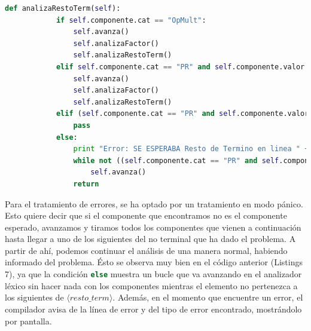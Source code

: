 \documentclass[11pt]{article}
\newcommand{\nt}[1]{\langle#1\rangle}
\begin{document}
\begin{minipage}{\linewidth}
	\begin{lstlisting}[language=Python, caption=analizaRestoTerm()]
		def analizaRestoTerm(self):
			if self.componente.cat == "OpMult":
				self.avanza()
				self.analizaFactor()
				self.analizaRestoTerm()
			elif self.componente.cat == "PR" and self.componente.valor == "Y":
				self.avanza()
				self.analizaFactor()
				self.analizaRestoTerm()
			elif (self.componente.cat == "PR" and self.componente.valor in ["ENTONCES", "HACER", "SINO", "O"]) or self.componente.cat == "ParentCi" or self.componente.cat == "CorCi" or self.componente.cat == "OpRel" or self.componente.cat == "PtoComa" or self.componente.cat == "OpAdd":
				pass
			else: 
				print "Error: SE ESPERABA Resto de Termino en linea " + str(self.lexico.nlinea)
				while not ((self.componente.cat == "PR" and self.componente.valor in ["O", "ENTONCES", "HACER", "SINO"]) or self.componente.cat == "OpRel" or self.componente.cat == "OpAdd" or self.componente.cat == "CorCi" or self.componente.cat == "ParentCi" or self.componente.cat == "PtoComa"):
					self.avanza()
				return
	\end{lstlisting}
\end{minipage}

Para el tratamiento de errores, se ha optado por un tratamiento en modo pánico. Esto quiere decir que si el componente que encontramos no es el componente esperado, avanzamos y tiramos todos los componentes que vienen a continuación hasta llegar a uno de los siguientes del no terminal que ha dado el problema. A partir de ahí, podemos continuar el análisis de una manera normal, habiendo informado del problema. Ésto se observa muy bien en el código anterior (Listings 7), ya que la condición \lstinline[language=Python]{else} muestra un bucle que va avanzando en el analizador léxico sin hacer nada con los componentes mientras el elemento no pertenezca a los siguientes de $\nt{resto\_term}$. Además, en el momento que encuentre un error, el compilador avisa de la línea de error y del tipo de error encontrado, mostrándolo por pantalla.
\end{document}

